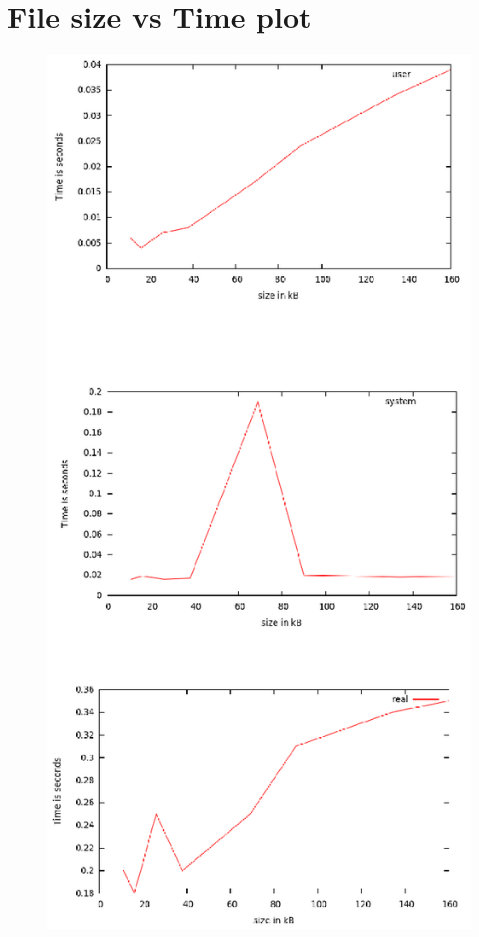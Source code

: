\documentclass[letterpaper,10pt,twocolumn,titlepage]{article}
\begin{document}
\section{File size vs Time plot}
		\begin{figure}
			\includegraphics[scale=0.3]{graphs.eps}
		\end{figure}
\end{document}
